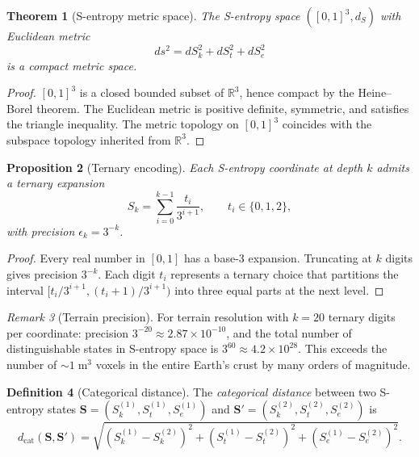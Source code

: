 \documentclass[10pt,twocolumn]{article}
\newtheorem{theorem}{Theorem}[section]
\newtheorem{proposition}[theorem]{Proposition}
\theoremstyle{definition}
\newtheorem{definition}[theorem]{Definition}
\theoremstyle{remark}
\newtheorem{remark}[theorem]{Remark}
\newcommand{\R}{\mathbb{R}}
\newcommand{\dcat}{d_{\mathrm{cat}}}
\newcommand{\Sk}{S_k}
\newcommand{\St}{S_t}
\newcommand{\Se}{S_e}
\begin{document}
\begin{theorem}[S-entropy metric space]\label{thm:smetric}
The S-entropy space $([0,1]^3, d_S)$ with Euclidean metric
\begin{equation}\label{eq:smetric}
  ds^2 = d\Sk^2 + d\St^2 + d\Se^2
\end{equation}
is a compact metric space.
\end{theorem}

\begin{proof}
$[0,1]^3$ is a closed bounded subset of $\R^3$, hence compact
by the Heine--Borel theorem.  The Euclidean metric is positive
definite, symmetric, and satisfies the triangle inequality.
The metric topology on $[0,1]^3$ coincides with the subspace
topology inherited from $\R^3$.
\end{proof}

\begin{proposition}[Ternary encoding]\label{prop:ternary}
Each S-entropy coordinate at depth $k$ admits a ternary
expansion
\begin{equation}\label{eq:ternary}
  \Sk = \sum_{i=0}^{k-1}\frac{t_i}{3^{i+1}},
  \qquad t_i\in\{0,1,2\},
\end{equation}
with precision $\epsilon_k = 3^{-k}$.
\end{proposition}

\begin{proof}
Every real number in $[0,1]$ has a base-3 expansion.
Truncating at $k$ digits gives precision $3^{-k}$.  Each digit
$t_i$ represents a ternary choice that partitions the interval
$[t_i/3^{i+1},(t_i+1)/3^{i+1})$ into three equal parts at the
next level.
\end{proof}

\begin{remark}[Terrain precision]
For terrain resolution with $k=20$ ternary digits per
coordinate: precision $3^{-20}\approx 2.87\times 10^{-10}$,
and the total number of distinguishable states in S-entropy
space is $3^{60}\approx 4.2\times 10^{28}$.  This exceeds the
number of $\sim 1\;\mathrm{m}^3$ voxels in the entire
Earth's crust by many orders of magnitude.
\end{remark}

\begin{definition}[Categorical distance]\label{def:dcat}
The \emph{categorical distance} between two S-entropy states
$\mathbf{S}=(S_k^{(1)},S_t^{(1)},S_e^{(1)})$ and
$\mathbf{S}'=(S_k^{(2)},S_t^{(2)},S_e^{(2)})$ is
\begin{equation}\label{eq:dcat}
  \dcat(\mathbf{S},\mathbf{S}')
  = \sqrt{(\Sk^{(1)}-\Sk^{(2)})^2
  + (\St^{(1)}-\St^{(2)})^2
  + (\Se^{(1)}-\Se^{(2)})^2}.
\end{equation}
\end{definition}
\end{document}
